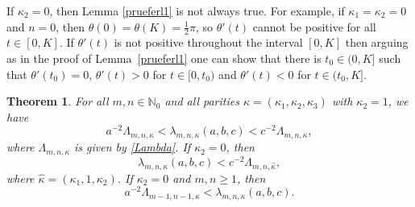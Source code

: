 \documentclass[10pt,a4paper]{amsart}
\newtheorem{thm}{Theorem}[section]
\newcommand{\N}{\mathbb{N}}
\numberwithin{equation}{section}
\begin{document}
If $\kappa_2=0$, then Lemma \ref{prueferl1} is not always true. For example, if $\kappa_1=\kappa_2=0$
and $n=0$, then $\theta(0)=\theta(K)=\tfrac12\pi$, so $\theta'(t)$ cannot be positive for all $t\in[0,K]$.
If $\theta'(t)$ is not positive throughout the interval $[0,K]$ then arguing as in the proof of Lemma~\ref{prueferl1}
one can show that there is $t_0\in(0,K]$ such that $\theta'(t_0)=0$, $\theta'(t)>0$ for $t\in[0,t_0)$ and
$\theta'(t)<0$ for $t\in(t_0,K]$.

\begin{thm}%
For all $m,n\in\N_0$ and all parities $\kappa=(\kappa_1,\kappa_2,\kappa_3)$ with $\kappa_2=1$, we have
\begin{equation}\label{ineq1}
 a^{-2}\Lambda_{m,n,\kappa}<\lambda_{m,n,\kappa}(a,b,c)< c^{-2}\Lambda_{m,n,\kappa},
 \end{equation}
where $\Lambda_{m,n,\kappa}$ is given by \eqref{Lambda}.
If $\kappa_2=0$, then
\begin{equation}\label{ineq2}
 \lambda_{m,n,\kappa}(a,b,c)<c^{-2}\Lambda_{m,n,\hat\kappa},
\end{equation}
where $\hat\kappa=(\kappa_1,1,\kappa_2)$.
If $\kappa_2=0$ and $m,n\ge 1$, then
\begin{equation}\label{ineq3}
 a^{-2}\Lambda_{m-1,n-1,\hat\kappa}<\lambda_{m,n,\kappa}(a,b,c) .
\end{equation}
\end{thm}
\end{document}

